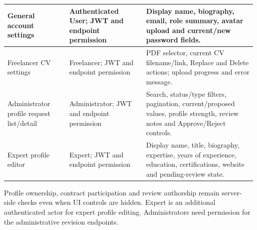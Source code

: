 \begin{longtable}{|L{2.3cm}|L{3.2cm}|L{8.4cm}|}
General account settings & Authenticated User; JWT and endpoint permission & Display name, biography, email, role summary, avatar upload and current/new password fields. \\ \hline
Freelancer CV settings & Freelancer; JWT and endpoint permission & PDF selector, current CV filename/link, Replace and Delete actions; upload progress and error message. \\ \hline
Administrator profile request list/detail & Administrator; JWT and endpoint permission & Search, status/type filters, pagination, current/proposed values, profile strength, review notes and Approve/Reject controls. \\ \hline
Expert profile editor & Expert; JWT and endpoint permission & Display name, title, biography, expertise, years of experience, education, certifications, website and pending-review state. \\ \hline
\end{longtable}
Profile ownership, contract participation and review authorship remain server-side checks even when UI controls are hidden. Expert is an additional authenticated actor for expert profile editing. Administrators need permission for the administrative revision endpoints.
